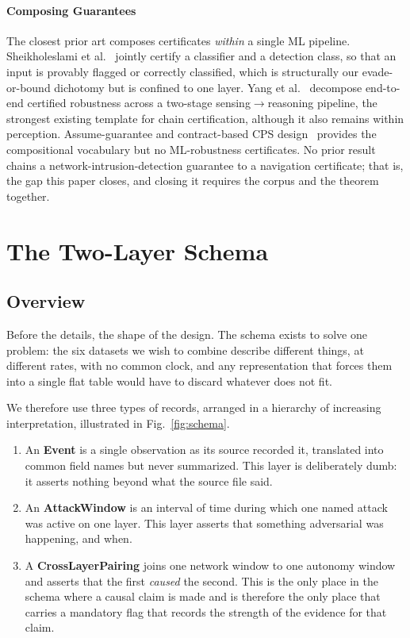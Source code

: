 \paragraph{Composing Guarantees}
The closest prior art composes certificates \emph{within} a single ML pipeline.
Sheikholeslami et al.~\cite{sheikholeslami2021provably} jointly certify a
classifier and a detection class, so that an input is provably flagged or correctly classified, which is structurally our evade-or-bound dichotomy but is confined to one layer. Yang et al.~\cite{yang2022sensing} decompose end-to-end certified
robustness across a two-stage sensing$\to$reasoning pipeline, the strongest
existing template for chain certification, although it also remains within perception. Assume-guarantee and contract-based CPS design~\cite{pacti2024} provides the compositional vocabulary but no ML-robustness certificates. No
prior result chains a network-intrusion-detection guarantee to a navigation certificate; that is, the gap this paper closes, and closing it requires the
corpus and the theorem together.

\section{The Two-Layer Schema}
\label{sec:schema}
\subsection{Overview}
Before the details, the shape of the design. The schema exists to solve one
problem: the six datasets we wish to combine describe different things, at
different rates, with no common clock, and any representation that forces them
into a single flat table would have to discard whatever does not fit.

We therefore use three types of records, arranged in a hierarchy of increasing
interpretation, illustrated in Fig.~\ref{fig:schema}.

\begin{enumerate}
\item An \textbf{Event} is a single observation as its source recorded it,
translated into common field names but never summarized. This layer is
deliberately dumb: it asserts nothing beyond what the source file said.
\item An \textbf{AttackWindow} is an interval of time during which one named
attack was active on one layer. This layer asserts that something adversarial
was happening, and when.
\item A \textbf{CrossLayerPairing} joins one network window to one autonomy
window and asserts that the first \emph{caused} the second. This is the only
place in the schema where a causal claim is made and is therefore the only
place that carries a mandatory flag that records the strength of the evidence for
that claim.
\end{enumerate}

